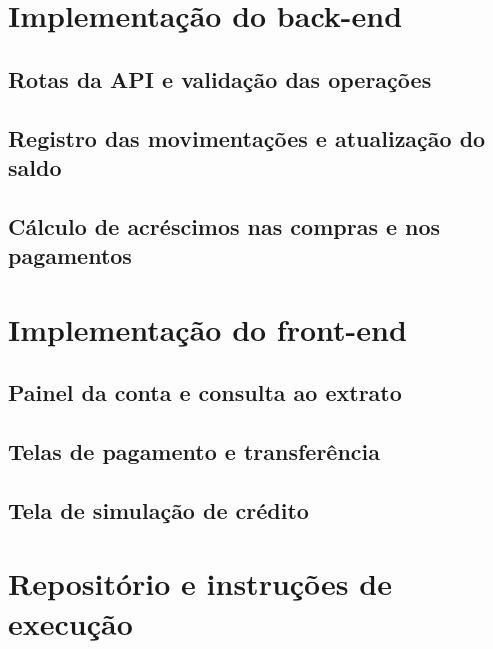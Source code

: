\section{Implementação do back-end} %
\label{cap-desenvolvimento-backend}

\subsection{Rotas da API e validação das operações} %
\label{cap-desenvolvimento-rotas-api}

\subsection{Registro das movimentações e atualização do saldo} %
\label{cap-desenvolvimento-movimentacoes-saldo}

\subsection{Cálculo de acréscimos nas compras e nos pagamentos} %
\label{cap-desenvolvimento-calculos-financeiros}

\section{Implementação do front-end} %
\label{cap-desenvolvimento-frontend}

\subsection{Painel da conta e consulta ao extrato} %
\label{cap-desenvolvimento-painel-conta}

\subsection{Telas de pagamento e transferência} %
\label{cap-desenvolvimento-telas-pagamento}

\subsection{Tela de simulação de crédito} %
\label{cap-desenvolvimento-tela-credito}

\section{Repositório e instruções de execução} %
\label{cap-desenvolvimento-repositorio}
